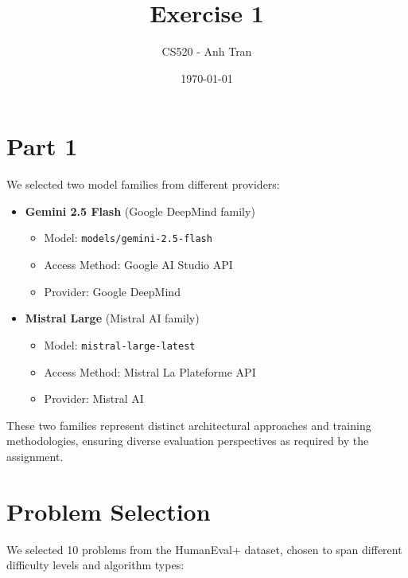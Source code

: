 \documentclass[11pt]{article}
\title{Exercise 1}
\author{CS520 - Anh Tran}
\date{\today}
\begin{document}
\maketitle

\section{Part 1}

We selected two model families from different providers:

\begin{itemize}
    \item \textbf{Gemini 2.5 Flash} (Google DeepMind family)
    \begin{itemize}
        \item Model: \texttt{models/gemini-2.5-flash}
        \item Access Method: Google AI Studio API
        \item Provider: Google DeepMind
    \end{itemize}
    
    \item \textbf{Mistral Large} (Mistral AI family)
    \begin{itemize}
        \item Model: \texttt{mistral-large-latest}
        \item Access Method: Mistral La Plateforme API
        \item Provider: Mistral AI
    \end{itemize}
\end{itemize}

These two families represent distinct architectural approaches and training methodologies, ensuring diverse evaluation perspectives as required by the assignment.

\section{Problem Selection}

We selected 10 problems from the HumanEval+ dataset, chosen to span different difficulty levels and algorithm types:
\end{document}
